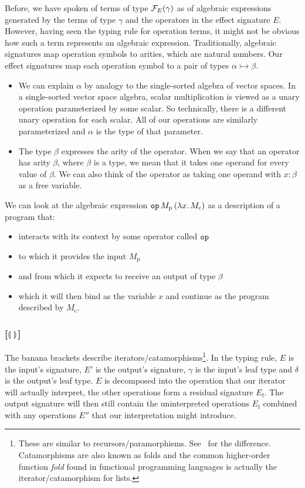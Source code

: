 \documentclass{llncs}
\begin{document}
Before, we have spoken of terms of type $\mathcal{F}_E(\gamma)$ as of algebraic
expressions generated by the terms of type $\gamma$ and the operators in
the effect signature $E$. However, having seen the typing rule for
operation terms, it might not be obvious how such a term represents an
algebraic expression. Traditionally, algebraic signatures map operation
symbols to arities, which are natural numbers. Our effect signatures map
each operation symbol to a pair of types $\alpha \rightarrowtail \beta$.
\begin{itemize}
\item We can explain $\alpha$ by analogy to the single-sorted algebra of
  vector spaces. In a single-sorted vector space algebra, scalar
  multiplication is viewed as a unary operation parameterized by some
  scalar. So technically, there is a different unary operation for each
  scalar. All of our operations are similarly parameterized and $\alpha$ is
  the type of that parameter.
\item The type $\beta$ expresses the arity of the operator. When we say
  that an operator has arity $\beta$, where $\beta$ is a type, we mean that
  it takes one operand for every value of $\beta$. We can also think of the
  operator as taking one operand with $x : \beta$ as a free variable.
\end{itemize}

We can look at the algebraic expression
$\mathtt{op}\,M_{\mathrm{p}}\,(\lambda x.\, M_{\mathrm{c}})$ as a description
of a program that:
\begin{itemize}
\item interacts with its context by some operator called $\mathtt{op}$
\item to which it provides the input $M_{\mathrm{p}}$
\item and from which it expects to receive an output of type $\beta$
\item which it will then bind as the variable $x$ and continue as the
  program described by $M_{\mathrm{c}}$.
\end{itemize}

\subsubsection*{[$\llparenthesis \,  \, \rrparenthesis$]}

The banana brackets describe iterators/catamorphisms\footnote{These are
  similar to recursors/paramorphisms. See~\cite{meijer1991functional} for
  the difference. Catamorphisms are also known as folds and the common
  higher-order function \emph{fold} found in functional programming
  languages is actually the iterator/catamorphism for lists.}. In the
typing rule, $E$ is the input's signature, $E'$ is the output's signature,
$\gamma$ is the input's leaf type and $\delta$ is the output's leaf
type. $E$ is decomposed into the operation that our iterator will actually
interpret, the other operations form a residual signature
$E_{\mathrm{f}}$. The output signature will then still contain the
uninterpreted operations $E_{\mathrm{f}}$ combined with any operations
$E''$ that our interpretation might introduce.
\end{document}
